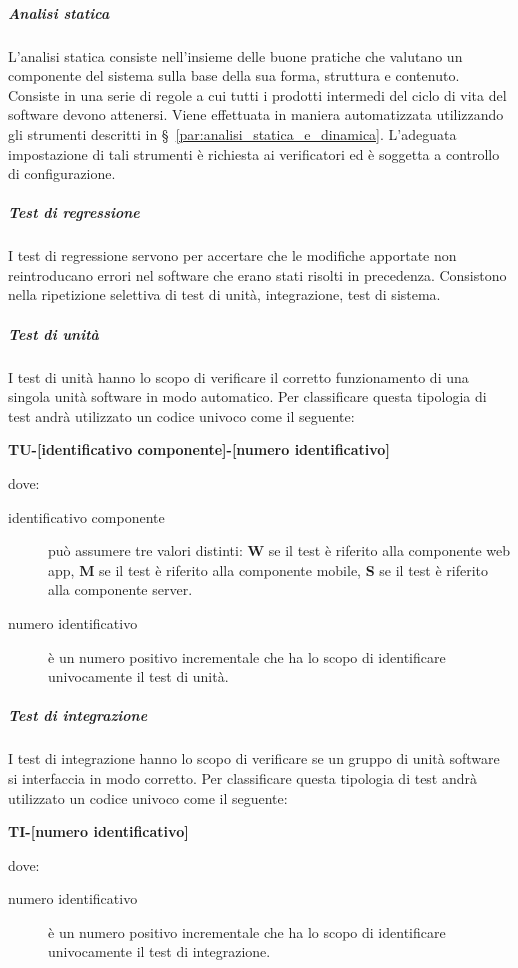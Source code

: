 \documentclass[../../norme-di-progetto.tex]{subfiles}
\begin{document}

\subparagraph{Analisi statica}%
\label{subp:verifica/analisi_statica}

L'analisi statica consiste nell'insieme delle buone pratiche che valutano un componente del sistema sulla base della sua forma, struttura e contenuto.
Consiste in una serie di regole a cui tutti i prodotti intermedi del ciclo di vita del software devono attenersi.
Viene effettuata in maniera automatizzata utilizzando gli strumenti descritti in §~\ref{par:analisi_statica_e_dinamica}. L'adeguata impostazione di tali strumenti è richiesta ai verificatori ed è soggetta a controllo di configurazione.

\subparagraph{Test di regressione}%
\label{subp:test_di_regressione}

I test di regressione servono per accertare che le modifiche apportate non reintroducano errori nel software che erano stati risolti in precedenza.
Consistono nella ripetizione selettiva di test di unità, integrazione, test di sistema.

\subparagraph{Test di unità}%
\label{subp:test_di_unita}
I test di unità hanno lo scopo di verificare il corretto funzionamento di una singola unità software in modo automatico.
Per classificare questa tipologia di test andrà utilizzato un codice univoco come il seguente:
\begin{center}
  \textbf{TU-[identificativo componente]-[numero identificativo]}
\end{center}
dove:
\begin{description}
  \item[identificativo componente] può assumere tre valori distinti: \textbf{W} se il test è riferito alla componente web app, \textbf{M} se il test è riferito alla componente mobile, \textbf{S} se il test è riferito alla componente server.
  \item[numero identificativo] è un numero positivo incrementale che ha lo scopo di identificare univocamente il test di unità.
\end{description}


\subparagraph{Test di integrazione}%
\label{subp:test_di_integrazione}
I test di integrazione hanno lo scopo di verificare se un gruppo di unità software si interfaccia in modo corretto.
Per classificare questa tipologia di test andrà utilizzato un codice univoco come il seguente:
\begin{center}
  \textbf{TI-[numero identificativo]}
\end{center}
dove:
\begin{description}
  \item [numero identificativo] è un numero positivo incrementale che ha lo scopo di identificare univocamente il test di integrazione.
\end{description}
\end{document}
